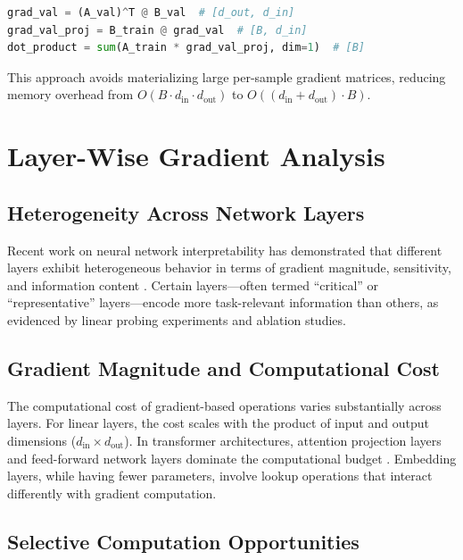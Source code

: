 \documentclass[12pt,a4paper]{report}
\begin{document}
\begin{lstlisting}[language=Python]
grad_val = (A_val)^T @ B_val  # [d_out, d_in]
grad_val_proj = B_train @ grad_val  # [B, d_in]
dot_product = sum(A_train * grad_val_proj, dim=1)  # [B]
\end{lstlisting}

This approach avoids materializing large per-sample gradient matrices, reducing memory overhead from $O(B \cdot d_{\text{in}} \cdot d_{\text{out}})$ to $O((d_{\text{in}} + d_{\text{out}}) \cdot B)$.

\section{Layer-Wise Gradient Analysis}
\label{sec:layer_analysis}

\subsection{Heterogeneity Across Network Layers}
\label{sec:heterogeneity}

Recent work on neural network interpretability has demonstrated that different layers exhibit heterogeneous behavior in terms of gradient magnitude, sensitivity, and information content \citep{alain2016understanding,morcos2018importance}. Certain layers---often termed ``critical'' or ``representative'' layers---encode more task-relevant information than others, as evidenced by linear probing experiments and ablation studies.

\subsection{Gradient Magnitude and Computational Cost}
\label{sec:grad_cost}

The computational cost of gradient-based operations varies substantially across layers. For linear layers, the cost scales with the product of input and output dimensions ($d_{\text{in}} \times d_{\text{out}}$). In transformer architectures, attention projection layers and feed-forward network layers dominate the computational budget \citep{vaswani2017attention}. Embedding layers, while having fewer parameters, involve lookup operations that interact differently with gradient computation.

\subsection{Selective Computation Opportunities}
\label{sec:selective_opp}
\end{document}
